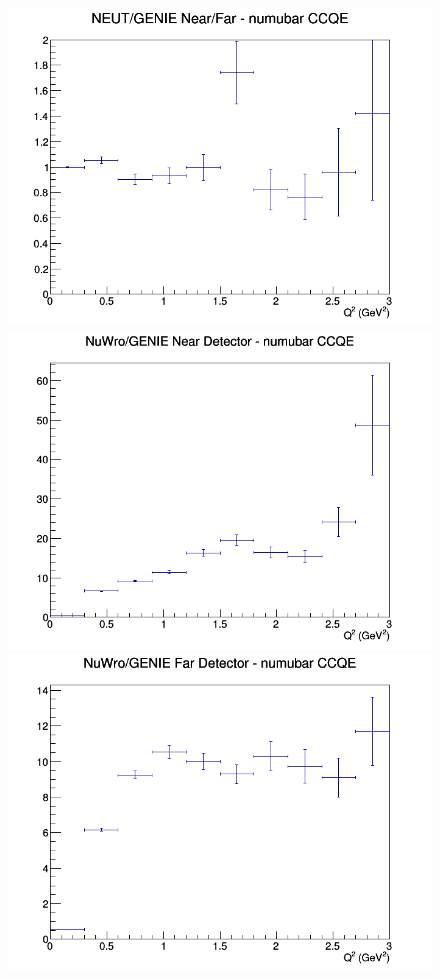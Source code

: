 \documentclass[12pt]{article}
\begin{document}
\begin{figure}[h]
\endminipage
{}
\includegraphics[width=\linewidth]{eff_Q2/LAr/ratios/CCQE_NEUT_GENIE_numubar_NF_Q2.png}
\endminipage
\newline
{}
\includegraphics[width=\linewidth]{eff_Q2/LAr/ratios/CCQE_NuWro_GENIE_numubar_near_Q2.png}
\endminipage
{}
\includegraphics[width=\linewidth]{eff_Q2/LAr/ratios/CCQE_NuWro_GENIE_numubar_far_Q2.png}

\end{figure}
\end{document}
